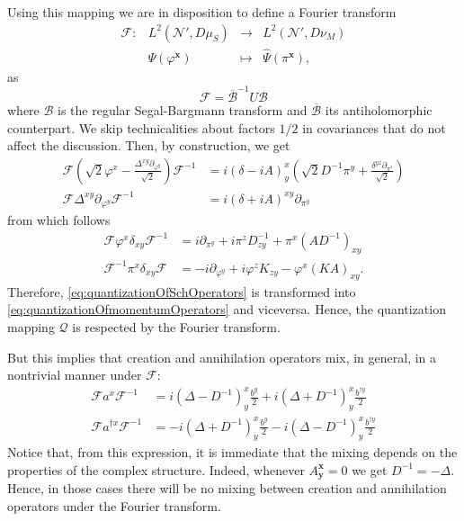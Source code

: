 \documentclass[12pt]{article}%
\begin{document}
Using this mapping we are in disposition to define a Fourier transform 
\begin{equation}
\label{eq:Fourier_momentum}
\begin{array}{cccc}
\mathcal{F} :& L^2(\mathcal{N}',D\mu_S) & \longrightarrow & L^2(\mathcal{N}',D\nu_M) \\ 
 & \Psi(\varphi^{\mathbf{x}}) &\longmapsto & \hat\Psi(\pi^\mathbf{x}),  
\end{array}
\end{equation}
as
\begin{equation}
\label{eq:Fourier}
\mathcal{F} ={\overline{\mathcal{B}}}^{-1} U {\mathcal{B}}
\end{equation}
where ${\mathcal{B}}$ is the regular Segal-Bargmann transform and $\overline{\mathcal{B}}$ its antiholomorphic counterpart. We skip technicalities about factors $1/2$ in covariances that do not affect the discussion. Then, by construction, we get  
\begin{align}
\label{eq:Fourier_momentum_final}
\mathcal{F} \left(\sqrt{2}\varphi^x-\frac{\Delta^{xy}\partial_{\varphi^y}}{\sqrt2}\right)\mathcal{F}^{-1}&= i(\delta-iA )^x_y\left(\sqrt{2}D^{-1}\pi^y+\frac{\delta^{yz}\partial_{\pi^z}}{\sqrt{2}}\right) \nonumber \\
\mathcal{F} \Delta^{xy}\partial_{\varphi^y}\mathcal{F}^{-1}&= i(\delta+iA)^{xy}\partial_{\pi^y} 
\end{align}
from which follows  
\begin{align}
    \label{eq:momentum}
    \mathcal{F} \varphi^x\delta_{xy}\mathcal{F}^{-1}&=i\partial_{\pi^y}+i{\pi^zD^{-1}_{zy}}+{\pi^x(AD^{-1})_{xy}} \nonumber \\
    \mathcal{F}^{-1} \pi^{x}\delta_{xy}\mathcal{F}&= -i\partial_{\varphi^y}+i{\varphi^zK_{zy}}-{\varphi^x(K A)_{xy}}.
\end{align}
Therefore,  \eqref{eq:quantizationOfSchOperators} is transformed into  \eqref{eq:quantizationOfmomentumOperators} and viceversa.  Hence, the quantization mapping $\mathcal{Q}$ is respected by the Fourier transform. 

But this implies that creation and annihilation operators mix, in general,  in a nontrivial manner under $\mathcal{F}$:
\begin{align}
    \label{eq:Fourier_creation}
    \mathcal{F}a^x\mathcal{F}^{-1}&= i(\Delta-D^{-1})^x_y\frac{b^y}{2}+i(\Delta+D^{-1})^x_y\frac{b^{\dagger y}}{2} \nonumber \\
    \mathcal{F}a^{\dagger x}\mathcal{F}^{-1}&= -i(\Delta+D^{-1})^x_y\frac{b^y}{2}-i(\Delta-D^{-1})^x_y\frac{b^{\dagger y}}{2} 
    \end{align}
Notice that, from this expression, it is immediate that 
the mixing depends on the properties of the complex structure. Indeed, whenever $A^{\mathbf{x}}_\mathbf{y}=0$ we get $D^{-1}=-\Delta$. Hence, in those cases there will be no mixing between creation and annihilation operators under the Fourier transform.
\end{document}

